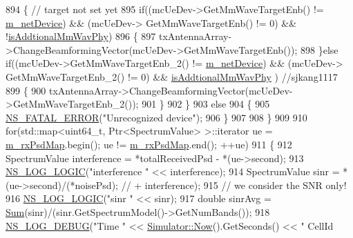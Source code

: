 \begin{DoxyCode}
894                 \{                                                                                                                       \textcolor{comment}{
      // target not set yet}
895                         \textcolor{keywordflow}{if}((mcUeDev->GetMmWaveTargetEnb() != \hyperlink{classns3_1_1MmWavePhy_a0f14f4e8f7539b06497ba321d9df344c}{m\_netDevice}) && (mcUeDev->
      GetMmWaveTargetEnb() != 0) && !\hyperlink{classns3_1_1MmWaveEnbPhy_a1a171ed81b1efedf963000d89f2cbd98}{isAddtionalMmWavPhy})
896                         \{
897                                 txAntennaArray->ChangeBeamformingVector(mcUeDev->GetMmWaveTargetEnb());
898                         \}\textcolor{keywordflow}{else} \textcolor{keywordflow}{if}((mcUeDev->GetMmWaveTargetEnb\_2() != \hyperlink{classns3_1_1MmWavePhy_a0f14f4e8f7539b06497ba321d9df344c}{m\_netDevice}) && (mcUeDev->
      GetMmWaveTargetEnb\_2() != 0) && \hyperlink{classns3_1_1MmWaveEnbPhy_a1a171ed81b1efedf963000d89f2cbd98}{isAddtionalMmWavPhy} ) \textcolor{comment}{//sjkang1117}
899                         \{
900                                 txAntennaArray->ChangeBeamformingVector(mcUeDev->GetMmWaveTargetEnb\_2());
901                         \}
902                 \}
903                 \textcolor{keywordflow}{else}
904                 \{
905                         \hyperlink{group__fatal_ga5131d5e3f75d7d4cbfd706ac456fdc85}{NS\_FATAL\_ERROR}(\textcolor{stringliteral}{"Unrecognized device"});
906                 \}
907 
908         \}
909 
910         \textcolor{keywordflow}{for}(std::map<uint64\_t, Ptr<SpectrumValue> >::iterator ue = \hyperlink{classns3_1_1MmWaveEnbPhy_a40b3813d00f430aed47e1ee084df4d78}{m\_rxPsdMap}.begin(); ue != 
      \hyperlink{classns3_1_1MmWaveEnbPhy_a40b3813d00f430aed47e1ee084df4d78}{m\_rxPsdMap}.end(); ++ue)
911         \{
912                 SpectrumValue interference = *totalReceivedPsd - *(ue->second);
913                 \hyperlink{group__logging_ga88acd260151caf2db9c0fc84997f45ce}{NS\_LOG\_LOGIC}(\textcolor{stringliteral}{"interference "} << interference);
914                 SpectrumValue sinr = *(ue->second)/(*noisePsd); \textcolor{comment}{// + interference); }
915                 \textcolor{comment}{// we consider the SNR only!}
916                 \hyperlink{group__logging_ga88acd260151caf2db9c0fc84997f45ce}{NS\_LOG\_LOGIC}(\textcolor{stringliteral}{"sinr "} << sinr);
917                 \textcolor{keywordtype}{double} sinrAvg = \hyperlink{namespacens3_afad5475661952172fe6ef1260360dad8}{Sum}(sinr)/(sinr.GetSpectrumModel()->GetNumBands());
918                 \hyperlink{group__logging_ga413f1886406d49f59a6a0a89b77b4d0a}{NS\_LOG\_DEBUG}(\textcolor{stringliteral}{"Time "} << \hyperlink{classns3_1_1Simulator_ac3178fa975b419f7875e7105be122800}{Simulator::Now}().GetSeconds() << \textcolor{stringliteral}{" CellId
}
\end{DoxyCode}
